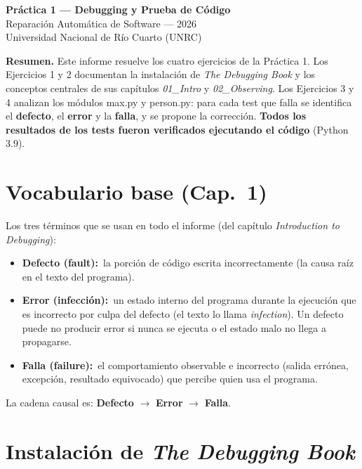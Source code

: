 \documentclass[11pt,a4paper]{article}
\newcommand{\defecto}{\textbf{\textcolor{bad}{Defecto (fault):}}\ }
\newcommand{\error}{\textbf{\textcolor{bad}{Error (infección):}}\ }
\newcommand{\falla}{\textbf{\textcolor{bad}{Falla (failure):}}\ }
\newcommand{\code}[1]{\colorbox{codebg}{\ttfamily\small #1}}
\begin{document}
\begin{center}
  {\LARGE\bfseries\color{brand} Práctica 1 --- Debugging y Prueba de Código}\\[0.4em]
  {\large Reparación Automática de Software --- 2026}\\[0.2em]
  {\normalsize Universidad Nacional de Río Cuarto (UNRC)}\\[1.2em]
\end{center}

\begin{answer}
\small\textbf{Resumen.} Este informe resuelve los cuatro ejercicios de la Práctica 1.
Los Ejercicios 1 y 2 documentan la instalación de \emph{The Debugging Book} y los conceptos
centrales de sus capítulos \emph{01\_Intro} y \emph{02\_Observing}. Los Ejercicios 3 y 4
analizan los módulos \code{max.py} y \code{person.py}: para cada test que falla se identifica el
\textbf{defecto}, el \textbf{error} y la \textbf{falla}, y se propone la corrección.
\textbf{Todos los resultados de los tests fueron verificados ejecutando el código} (Python 3.9).
\end{answer}

\section*{\normalsize\color{brand}Vocabulario base (Cap.\ 1)}
\vspace{-0.4em}
Los tres términos que se usan en todo el informe (del capítulo \emph{Introduction to Debugging}):
\begin{itemize}[leftmargin=1.4em, itemsep=2pt]
  \item \defecto la porción de código escrita incorrectamente (la causa raíz en el texto del programa).
  \item \error un estado interno del programa durante la ejecución que es incorrecto por culpa del defecto (el texto lo llama \emph{infection}). Un defecto puede no producir error si nunca se ejecuta o el estado malo no llega a propagarse.
  \item \falla el comportamiento observable e incorrecto (salida errónea, excepción, resultado equivocado) que percibe quien usa el programa.
\end{itemize}
La cadena causal es: \textbf{Defecto} $\rightarrow$ \textbf{Error} $\rightarrow$ \textbf{Falla}.

\newpage
\section{Instalación de \emph{The Debugging Book}}
\end{document}
